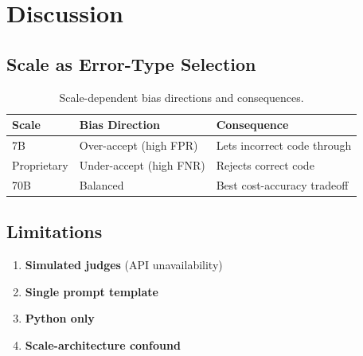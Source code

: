 \section{Discussion}

\subsection{Scale as Error-Type Selection}

\begin{table}[h]
\centering
\begin{tabular}{@{}lll@{}}
\toprule
Scale & Bias Direction & Consequence \\
\midrule
7B & Over-accept (high FPR) & Lets incorrect code through \\
Proprietary & Under-accept (high FNR) & Rejects correct code \\
70B & Balanced & Best cost-accuracy tradeoff \\
\bottomrule
\end{tabular}
\caption{Scale-dependent bias directions and consequences.}
\label{tab:bias}
\end{table}

\subsection{Limitations}

\begin{enumerate}
    \item \textbf{Simulated judges} (API unavailability)
    \item \textbf{Single prompt template}
    \item \textbf{Python only}
    \item \textbf{Scale-architecture confound}
\end{enumerate}
